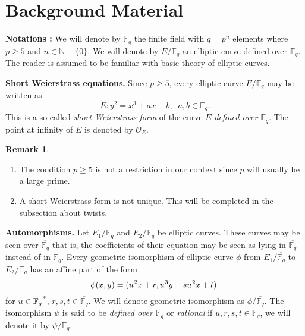 \documentclass[10pt]{article}
\theoremstyle{definition}
\newtheorem{remark}{Remark}
\newcommand{\N}{\mathbb{N}}
\newcommand{\F}{\mathbb{F}}
\begin{document}
\section{Background Material}

\textbf{Notations :}
We will denote by $\F_q$ the finite field with $q = p^n$ elements where $p \geq 5$ and $n \in \N - \lbrace 0 \rbrace$.
We will denote by $E/\F_q$ an elliptic curve defined over $\F_q$. 
The reader is assumed to be familiar with basic theory of elliptic curves.


\noindent \textbf{Short Weierstrass equations.}  Since $p\geq 5$, every elliptic curve $E/\F_q$ may be written as
\[ E : y^2 = x^3 + ax + b, \; \; a,b \in \F_q. \]
This is a so called \textsl{short Weierstrass form} of the curve $E$ \textsl{defined over $\F_q$}.
The point at infinity of $E$ is denoted by $\mathcal{O}_E$.

\noindent \begin{remark} 
\begin{enumerate}
\item The condition $p \geq 5$ is not a restriction in our context since $p$ will usually be a large prime.
\item A short Weierstrass form is not unique.
This will be completed in the subsection about twists.
\end{enumerate}
\end{remark}

\noindent \textbf{Automorphisms.} Let $E_1/\F_q$ and $E_2/\F_q$ be elliptic curves. 
These curves may be seen over $\overline{\F_q}$ that is, the coefficients of their equation may be seen as lying in $\overline{\F_q}$ instead of in $\F_q$.
Every geometric isomorphism of elliptic curve $\phi$ from $E_1/\overline{\F_q}$ to $E_2/\overline{\F_q}$ has an  affine part of the form 
\begin{equation}\label{morphism}
 \phi(x,y) = (u^{\mkern1mu 2}x + r, u^{\mkern1mu 3}y + su^{\mkern1mu 2}x + t).
\end{equation}
for $u \in \overline{\F_q}^{\mkern1mu *}$, $r,s,t \in \overline{\F_q}$.
We will denote geometric isomorphism as $\phi/\overline{\F_q}$.
The isomorphism $\psi$ is said to be \textsl{defined over $\F_q$} or \textsl{rational} if $u,r,s,t \in \F_q$, we will denote it by $\psi/\F_q$.
\end{document}
